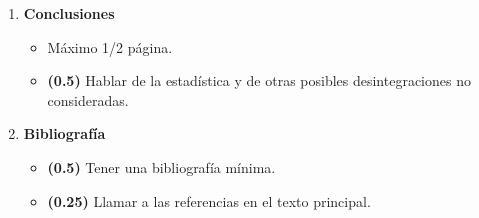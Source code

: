 \documentclass[11pt]{articulo}
\begin{document}
\begin{enumerate}
\begin{itemize}
\end{itemize}

\item {\bf Conclusiones}

\begin{itemize}

\item M\'aximo 1/2 p\'agina.

\item {\bf (0.5)} Hablar de la estad\'istica y de otras posibles desintegraciones no consideradas.

\end{itemize}

\item {\bf Bibliograf\'ia}

\begin{itemize}

\item {\bf (0.5)} Tener una bibliograf\'ia m\'inima.

\item {\bf (0.25)} Llamar a las referencias en el texto principal.

\end{itemize}

\end{enumerate}
\end{document}
